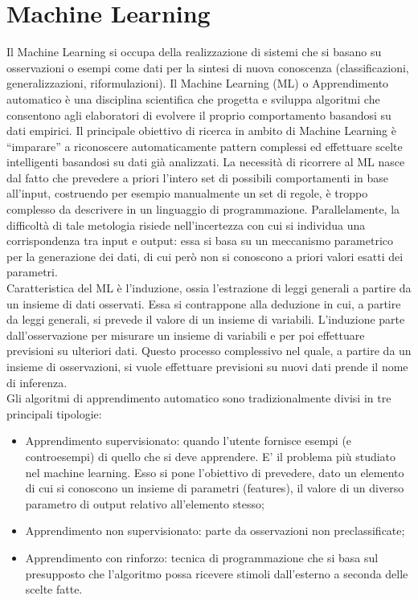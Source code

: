 \section{Machine Learning}
Il Machine Learning si occupa della realizzazione di sistemi che si basano su osservazioni o esempi come dati per la sintesi di nuova conoscenza (classificazioni,
generalizzazioni, riformulazioni). Il Machine Learning (ML) o Apprendimento automatico è una disciplina scientifica che progetta e sviluppa algoritmi che consentono agli elaboratori di evolvere il proprio comportamento basandosi su dati empirici. Il principale obiettivo di ricerca in ambito di Machine Learning è “imparare” a riconoscere automaticamente pattern complessi ed effettuare scelte intelligenti basandosi su dati già analizzati. La necessità di ricorrere al ML nasce dal fatto che prevedere a priori l'intero set di possibili comportamenti in base all'input, costruendo per esempio manualmente un set di regole, è troppo complesso da descrivere in un linguaggio di programmazione. Parallelamente, la difficoltà di tale metologia risiede nell'incertezza con cui si individua una corrispondenza tra input e output: essa si basa su un meccanismo parametrico per la generazione dei dati, di cui però non si conoscono a priori valori esatti dei parametri.\\
Caratteristica del ML è l'induzione, ossia l’estrazione di leggi generali a partire da un insieme di dati osservati. Essa si contrappone alla deduzione in cui, a partire da leggi generali, si prevede il valore di un insieme di variabili. L’induzione parte dall’osservazione per misurare un insieme di variabili e per poi
effettuare previsioni su ulteriori dati. Questo processo complessivo nel quale, a
partire da un insieme di osservazioni, si vuole effettuare previsioni su nuovi dati
prende il nome di inferenza.\\
Gli algoritmi di apprendimento automatico sono tradizionalmente divisi in tre principali tipologie:
\begin{itemize}
	\item Apprendimento supervisionato: quando l'utente fornisce esempi (e
	controesempi) di quello che si deve apprendere. E' il problema più studiato
	nel machine learning. Esso si pone l’obiettivo di prevedere, dato un
	elemento di cui si conoscono un insieme di parametri (features), il valore di
	un diverso parametro di output relativo all’elemento stesso;
	\item Apprendimento non supervisionato: parte da osservazioni non preclassificate;
	\item Apprendimento con rinforzo: tecnica di programmazione che si basa sul
	presupposto che l'algoritmo possa ricevere stimoli dall'esterno a seconda
	delle scelte fatte.
\end{itemize}
